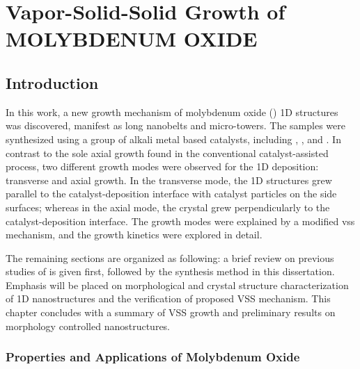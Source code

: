 \chapter{Vapor-Solid-Solid Growth of MOLYBDENUM OXIDE}

\section{Introduction}

In this work, a new growth mechanism of molybdenum oxide () 1D structures was discovered, manifest as  long nanobelts and micro-towers. The samples were synthesized using a group of alkali metal based catalysts, including , , and . In contrast to the sole axial growth found in the conventional catalyst-assisted process, two different growth modes were observed for the 1D  deposition: transverse and axial growth. In the transverse mode, the 1D structures grew parallel to the catalyst-deposition interface with catalyst particles on the side surfaces; whereas in the axial mode, the crystal grew perpendicularly to the catalyst-deposition interface. The growth modes were explained by a modified \gls{vss} mechanism, and the growth kinetics were explored in detail. 

The remaining sections are organized as following: a brief review on previous studies of  is given first, followed by the synthesis method in this dissertation. Emphasis will be placed on morphological and crystal structure characterization of 1D  nanostructures and the verification of proposed VSS mechanism. This chapter concludes with a summary of VSS growth and preliminary results on morphology controlled  nanostructures. 

\subsection{Properties and Applications of Molybdenum Oxide}


